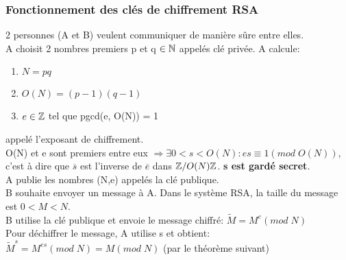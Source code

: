 \subsubsection{Fonctionnement des clés de chiffrement RSA}

2 personnes (A et B) veulent communiquer de manière sûre entre elles.\\

A choisit 2 nombres premiers p et q $\in \mathbb{N}$ appelés clé privée. A calcule:\\

\begin{enumerate}
\item $N = pq$
\item $O(N) = (p-1)(q-1)$
\item $e \in \mathbb{Z}$ tel que pgcd(e, O(N)) = 1
\end{enumerate}

appelé l'exposant de chiffrement.\\

O(N) et e sont premiers entre eux $\Rightarrow \exists 0 < s < O(N): es \equiv 1(mod\;O(N))$, c'est à dire que $\overline{s}$ est l'inverse de $\overline{e}$ dans $\mathbb{Z}/O(N)\mathbb{Z}$. \textbf{s est gardé secret}. \\

A publie les nombres (N,e) appelés la clé publique.\\

B souhaite envoyer un message à A. Dans le système RSA, la taille du message est $0<M<N$.\\

B utilise la clé publique et envoie le message chiffré: $\tilde{M} = M^e (mod\;N)$\\

Pour déchiffrer le message, A utilise s et obtient: $\tilde{M}^s = M^{es}(mod\;N) = M(mod\;N)$ (par le théorème suivant)\\